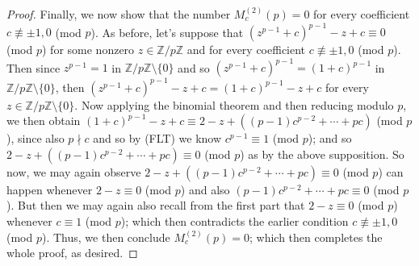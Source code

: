 \documentclass{article}
\theoremstyle{plain}
\theoremstyle{definition}
\begin{document}
\begin{proof}
Finally, we now show that the number $M_{c}^{(2)}(p) = 0$ for every coefficient $c\not \equiv \pm1, 0$ (mod $p$). As before, let's suppose that $(z^{p-1}+c)^{p-1} - z + c\equiv 0$ (mod $p$) for some nonzero $z\in \mathbb{Z}\slash p\mathbb{Z}$ and for every coefficient $c\not \equiv \pm1, 0$ (mod $p$). Then since $z^{p-1} = 1$ in $\mathbb{Z}\slash p \mathbb{Z}\setminus \{0\}$ and so $(z^{p-1} + c)^{p-1} = (1 + c)^{p-1}$ in $\mathbb{Z}\slash p \mathbb{Z}\setminus \{0\}$, then $(z^{p-1}+c)^{p-1} - z + c = (1+c)^{p-1} - z + c$ for every $z\in \mathbb{Z}\slash p \mathbb{Z}\setminus \{0\}$. Now applying the binomial theorem and then reducing modulo $p$, we then obtain $(1+c)^{p-1} - z + c\equiv 2-z + ((p-1)c^{p-2} + \cdots + pc)$ (mod $p$), since also $p\nmid c$ and so by (FLT) we know $c^{p-1} \equiv 1$ (mod $p$); and so $2-z + ((p-1)c^{p-2} + \cdots + pc)\equiv 0$ (mod $p$) as by the above supposition. So now, we may again observe $2-z + ((p-1)c^{p-2} + \cdots + pc)\equiv 0$ (mod $p$) can happen whenever $2-z\equiv 0$ (mod $p$) and also $(p-1)c^{p-2} + \cdots + pc\equiv 0$ (mod $p$). But then we may again also recall from the first part that $2-z\equiv 0$ (mod $p$) whenever $c\equiv 1$ (mod $p$); which then contradicts the earlier condition $c\not \equiv \pm1, 0$ (mod $p$). Thus, we then conclude  $M_{c}^{(2)}(p) = 0$; which then completes the whole proof, as desired.
\end{proof}
\end{document}
